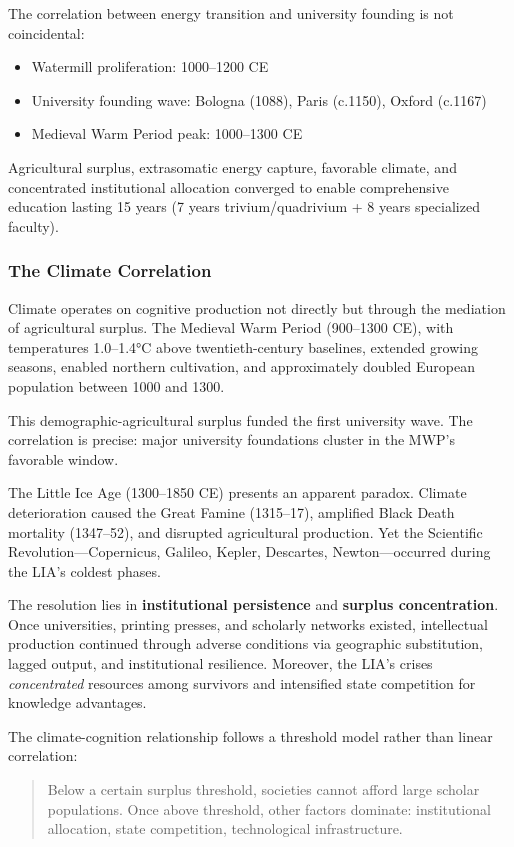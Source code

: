 The correlation between energy transition and university founding is not coincidental:
\begin{itemize}
    \item Watermill proliferation: 1000--1200 CE
    \item University founding wave: Bologna (1088), Paris (c.1150), Oxford (c.1167)
    \item Medieval Warm Period peak: 1000--1300 CE
\end{itemize}

Agricultural surplus, extrasomatic energy capture, favorable climate, and concentrated institutional allocation converged to enable comprehensive education lasting 15 years (7 years trivium/quadrivium + 8 years specialized faculty).

\subsubsection{The Climate Correlation}

Climate operates on cognitive production not directly but through the mediation of agricultural surplus. The Medieval Warm Period (900--1300 CE), with temperatures 1.0--1.4°C above twentieth-century baselines, extended growing seasons, enabled northern cultivation, and approximately doubled European population between 1000 and 1300.

This demographic-agricultural surplus funded the first university wave. The correlation is precise: major university foundations cluster in the MWP's favorable window.

The Little Ice Age (1300--1850 CE) presents an apparent paradox. Climate deterioration caused the Great Famine (1315--17), amplified Black Death mortality (1347--52), and disrupted agricultural production. Yet the Scientific Revolution---Copernicus, Galileo, Kepler, Descartes, Newton---occurred during the LIA's coldest phases.

The resolution lies in \textbf{institutional persistence} and \textbf{surplus concentration}. Once universities, printing presses, and scholarly networks existed, intellectual production continued through adverse conditions via geographic substitution, lagged output, and institutional resilience. Moreover, the LIA's crises \textit{concentrated} resources among survivors and intensified state competition for knowledge advantages.

The climate-cognition relationship follows a threshold model rather than linear correlation:
\begin{quote}
Below a certain surplus threshold, societies cannot afford large scholar populations. Once above threshold, other factors dominate: institutional allocation, state competition, technological infrastructure.
\end{quote}

